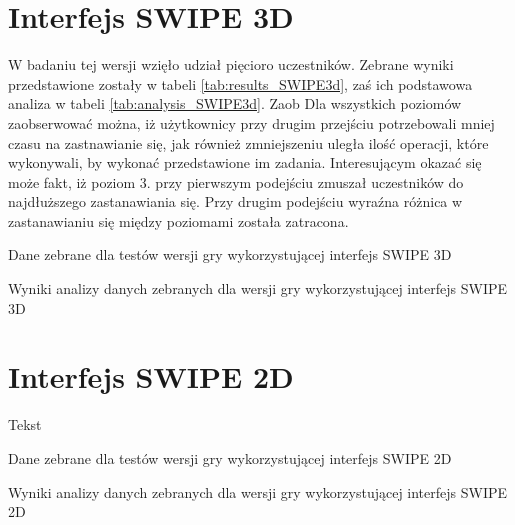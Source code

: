 \documentclass[a4paper,12pt,numbers=noenddot]{report}
\begin{document}
\section{Interfejs SWIPE 3D}%
W badaniu tej wersji wzięło udział pięcioro uczestników. Zebrane wyniki przedstawione zostały w tabeli \ref{tab:results_SWIPE3d}, zaś ich podstawowa analiza w tabeli \ref{tab:analysis_SWIPE3d}. Zaob
Dla wszystkich poziomów zaobserwować można, iż użytkownicy przy drugim przejściu potrzebowali mniej czasu na zastnawianie się, jak również zmniejszeniu uległa ilość operacji, które wykonywali, by wykonać przedstawione im zadania. 
Interesującym okazać się może fakt, iż poziom 3. przy pierwszym podejściu zmuszał uczestników do najdłuższego zastanawiania się. Przy drugim podejściu wyraźna różnica w zastanawianiu się między poziomami została zatracona.

\begin{table}

  \caption{Dane zebrane dla testów wersji gry wykorzystującej interfejs SWIPE 3D}
  \resizebox{\textwidth}{!}{%
	
  \end{tabular}%
  }
  \label{tab:results_SWIPE3d}%
  \caption{Wyniki analizy danych zebranych dla wersji gry wykorzystującej interfejs SWIPE 3D}
  \resizebox{\textwidth}{!}{%
	
  \end{tabular}%
  }
  \label{tab:analysis_SWIPE3d}%
\end{table}%


\section{Interfejs SWIPE 2D}%
Tekst
\begin{table}
  \caption{Dane zebrane dla testów wersji gry wykorzystującej interfejs SWIPE 2D}
  \resizebox{0.9\textwidth}{!}{%
	
  }
  \label{tab:results_SWIPE2d}%
  
  
  \caption{Wyniki analizy danych zebranych dla wersji gry wykorzystującej interfejs SWIPE 2D}
  \resizebox{0.9\textwidth}{!}{%
	
  }
  \label{tab:analysis_SWIPE2d}%
\end{table}%
\end{document}
